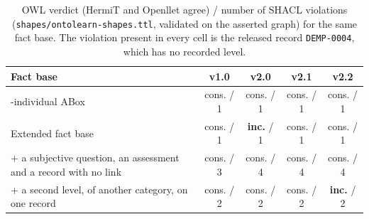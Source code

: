 \begin{table}[!t]
\caption{OWL verdict (HermiT and Openllet agree) / number of SHACL violations (\texttt{shapes/ontolearn-shapes.ttl}, validated on the asserted graph) for the same fact base. The violation present in every cell is the released record \texttt{DEMP-0004}, which has no recorded level.}
\label{tab:shacl}
\centering
\footnotesize
\begin{tabular}{>{\raggedright\arraybackslash}p{2.55cm}cccc}
\hline
\textbf{Fact base} & \textbf{v1.0} & \textbf{v2.0} & \textbf{v2.1} & \textbf{v2.2} \\
\hline
20-individual ABox & cons. / 1 & cons. / 1 & cons. / 1 & cons. / 1 \\
Extended fact base & cons. / 1 & \textbf{inc.} / 1 & cons. / 1 & cons. / 1 \\
+ a subjective question, an assessment and a record with no link & cons. / 3 & cons. / 4 & cons. / 4 & cons. / 4 \\
+ a second level, of another category, on one record & cons. / 2 & cons. / 2 & cons. / 2 & \textbf{inc.} / 2 \\
\hline
\end{tabular}
\end{table}
